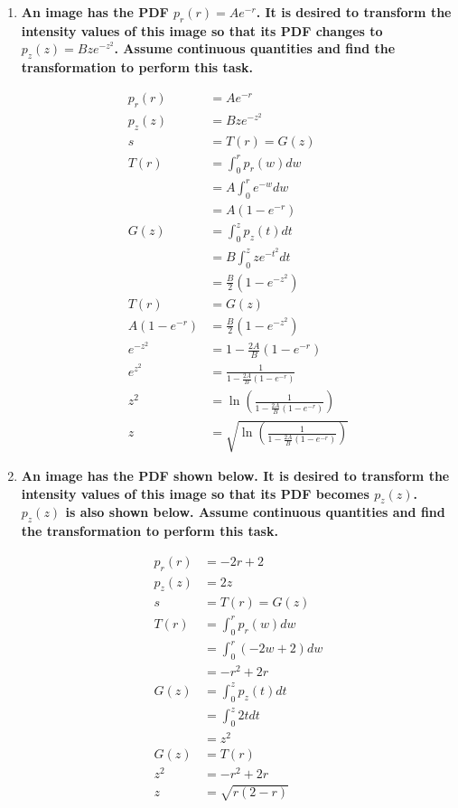 \begin{enumerate}[font=\bfseries]

    \item \textbf{An image has the PDF $p_r(r)=Ae^{-r}$. It is desired to
    transform the intensity values of this image so that its PDF changes to
    $p_z(z)=Bze^{-z^{2}}$. Assume continuous quantities and find the
    transformation to perform this task.}
    
    \begin{align*}
	p_r(r) &= Ae^{-r} \\
	p_z(z) &= Bze^{-z^{2}} \\
	s &= T(r) = G(z) \\
	T(r) &= \int_{0}^{r}p_r(w)dw \\
	&= A\int_{0}^{r}e^{-w}dw \\
	&= A(1-e^{-r}) \\
	G(z) &= \int_{0}^{z}p_z(t)dt \\
	&= B\int_{0}^{z}ze^{-t^{2}}dt \\
	&= \frac{B}{2}(1-e^{-z^{2}}) \\
	T(r) &= G(z) \\
	A(1-e^{-r}) &= \frac{B}{2}(1-e^{-z^{2}}) \\
	e^{-z^{2}} &= 1 - \frac{2A}{B}(1-e^{-r}) \\
	e^{z^{2}} &= \frac{1}{1 - \frac{2A}{B}(1-e^{-r})} \\
	z^{2} &= \ln\left(\frac{1}{1 - \frac{2A}{B}(1-e^{-r})}\right) \\
	z &= \sqrt{\ln\left(\frac{1}{1 - \frac{2A}{B}(1-e^{-r})}\right)}
	\end{align*}
    
    \pagebreak 

    \item \textbf{An image has the PDF shown below. It is desired to transform
    the intensity values of this image so that its PDF becomes $p_z(z)$.
    $p_z(z)$ is also shown below. Assume continuous quantities and find the
    transformation to perform this task.}
   
    \begin{align*}
	p_r(r) &= -2r + 2 \\
	p_z(z) &= 2z \\
	s &= T(r) = G(z) \\
	T(r) &= \int_{0}^{r}p_r(w)dw \\
	&= \int_{0}^{r}(-2w+2)dw \\
	&= -r^{2} + 2r \\
	G(z) &= \int_{0}^{z}p_z(t)dt \\
	&= \int_{0}^{z}2tdt \\
	&= z^{2} \\
	G(z) &= T(r) \\
	z^{2} &= -r^{2} + 2r \\
	z &= \sqrt{r(2-r)}
    \end{align*} 


\end{enumerate}
